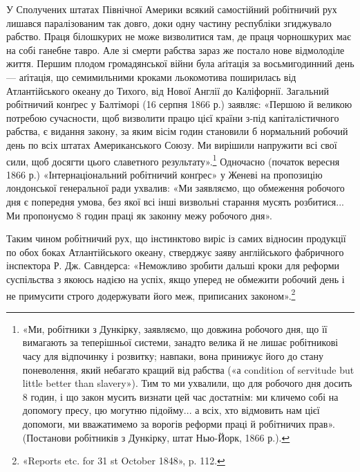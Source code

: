 У Сполучених штатах Північної Америки всякий самостійний
робітничий рух лишався паралізованим так довго, доки
одну частину республіки згиджувало рабство. Праця білошкурих
не може визволитися там, де праця чорношкурих має на собі
ганебне тавро. Але зі смерти рабства зараз же постало нове відмолоділе
життя. Першим плодом громадянської війни була аґітація
за восьмигодинний день — аґітація, що семимильними
кроками льокомотива поширилась від Атлантійського океану до
Тихого, від Нової Англії до Каліфорнії. Загальний робітничий
конґрес у Балтіморі (16 серпня 1866 р.) заявляє: «Першою й
великою потребою сучасности, щоб визволити працю цієї країни
з-під капіталістичного рабства, є видання закону, за яким вісім
годин становили б нормальний робочий день по всіх штатах Американського
Союзу. Ми вирішили напружити всі свої сили, щоб
досягти цього славетного результату».\footnote{
«Ми, робітники з Дункірку, заявляємо, що довжина робочого
дня, що її вимагають за теперішньої системи, занадто велика й не лишає
робітникові часу для відпочинку і розвитку; навпаки, вона принижує
його до стану поневолення, який небагато кращий від рабства («а condition
of servitude but little better than slavery»). Тим то ми ухвалили, що
для робочого дня досить 8 годин, і що закон мусить визнати цей час достатнім:
ми кличемо собі на допомогу пресу, цю могутню підойму... а
всіх, хто відмовить нам цієї допомоги, ми вважатимемо за ворогів реформи
праці й робітничих прав». (Постанови робітників з Дункірку, штат
Нью-Йорк, 1866 р.).
} Одночасно (початок
вересня 1866 р.) «Інтернаціональний робітничий конґрес» у Женеві
на пропозицію лондонської генеральної ради ухвалив: «Ми
заявляємо, що обмеження робочого дня є попередня умова, без
якої всі інші визвольні старання мусять розбитися... Ми пропонуємо
8 годин праці як законну межу робочого дня».

Таким чином робітничий рух, що інстинктово виріс із самих
відносин продукції по обох боках Атлантійського океану, стверджує
заяву англійського фабричного інспектора Р. Дж. Савндерса:
«Неможливо зробити дальші кроки для реформи суспільства
з якоюсь надією на успіх, якщо уперед не обмежити робочий
день і не примусити строго додержувати його меж, приписаних
законом».\footnote{
«Reports etc. for 31 st October 1848», p. 112.
}

